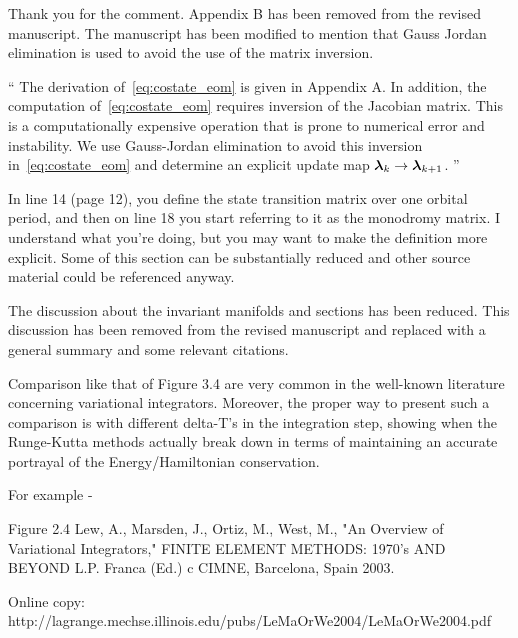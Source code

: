 \documentclass[11pt]{article}
\newenvironment{correction}{\begin{list}{}{\setlength{\leftmargin}{1cm}\setlength{\rightmargin}{1cm}}\vspace{\parsep}\item[]``}{''\end{list}}
\begin{document}
\begin{enumerate}
Thank you for the comment.
Appendix B has been removed from the revised manuscript.
The manuscript has been modified to mention that Gauss Jordan elimination is used to avoid the use of the matrix inversion.

\begin{correction}
The derivation of~\cref{eq:costate_eom} is given in Appendix A.
In addition, the computation of~\cref{eq:costate_eom} requires inversion of the Jacobian matrix.
This is a computationally expensive operation that is prone to numerical error and instability.
We use Gauss-Jordan elimination to avoid this inversion in~\cref{eq:costate_eom} and determine an explicit update map \( \bm{\lambda}_k \to \bm{\lambda}_{k+1} \).
\end{correction}

\item 
    \begin{itshape}
In line 14 (page 12), you define the state transition matrix over one orbital period, and then on line 18 you start referring to it as the monodromy matrix.  I understand what you're doing, but you may want to make the definition more explicit.  Some of this section can be substantially reduced and other source material could be referenced anyway.
\end{itshape}

The discussion about the invariant manifolds and \Poincare sections has been reduced.
This discussion has been removed from the revised manuscript and replaced with a general summary and some relevant citations.

\item 
    \begin{itshape}
Comparison like that of Figure 3.4 are very common in the well-known literature concerning variational integrators.  Moreover, the proper way to present such a comparison is with different delta-T's in the integration step, showing when the Runge-Kutta methods actually break down in terms of maintaining an accurate portrayal of the Energy/Hamiltonian conservation.

For example -

Figure 2.4
Lew, A., Marsden, J., Ortiz, M., West, M., "An Overview of Variational Integrators," FINITE ELEMENT METHODS: 1970's AND BEYOND L.P. Franca (Ed.) c CIMNE, Barcelona, Spain 2003.

Online copy:
http://lagrange.mechse.illinois.edu/pubs/LeMaOrWe2004/LeMaOrWe2004.pdf
\end{itshape}


\end{enumerate}
\end{document}
